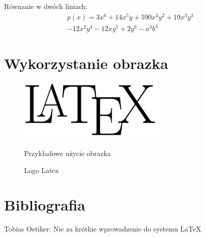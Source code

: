 \documentclass[11pt,twoside,a4paper]{article}
\begin{document}
\begin{center}
Równanie w dwóch liniach:
\begin{align*}
p(x) = 3x^6 + 14x^5y + 590x^4y^2 + 19x^3y^3\\ 
- 12x^2y^4 - 12xy^5 + 2y^6 - a^3b^3
\end{align*}
\end{center}
\newpage

\section{Wykorzystanie obrazka}
\begin{figure}[ht]
\begin{center}
\includegraphics[width=7cm]{logo}
\caption{Logo Latex}{Przykładowe użycie obrazka}
\label{rys_model}
\end{center}
\end{figure}

\section{Bibliografia}
\begin{thebibliography}{99}
 Tobias Oetiker:
Nie za krótkie wprowadzenie do systemu LaTeX
\end{thebibliography}
\end{document}
